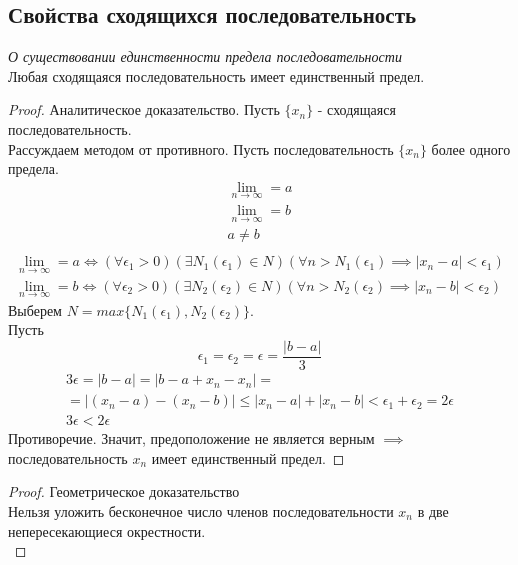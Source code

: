 \subsection{Свойства сходящихся последовательность}

\begin{theorem}
  \textit{О существовании единственности предела последовательности} \\
  Любая сходящаяся последовательность имеет единственный предел.
\end{theorem}
\begin{proof} Аналитическое доказательство.
  Пусть $\{x_{n}\} $ - сходящаяся последовательность. \\
  Рассуждаем методом от противного. Пусть последовательность $\{x_{n}\} $ более одного предела.
  \begin{gather*}
    \lim_{n \to \infty} = a \\
    \lim_{n \to \infty} = b \\
    a \neq b \\
  \end{gather*}
  \begin{gather}
    \lim_{n \to \infty} = a \iff (\forall \epsilon_1 > 0)(\exists N_1(\epsilon_1) \in N)(\forall n > N_1(\epsilon_1) \implies |x_{n} - a| < \epsilon_1) \\
    \lim_{n \to \infty} = b \iff (\forall \epsilon_2 > 0)(\exists N_2(\epsilon_2) \in N)(\forall n > N_2(\epsilon_2) \implies |x_{n} - b| < \epsilon_2)  
  \end{gather} 
  Выберем $N=max \{N_1\left( \epsilon_1 \right) , N_2\left( \epsilon_2 \right) \}$. \\
  Пусть 
  \[
    \epsilon_1 = \epsilon_2 = \epsilon = \frac{|b - a|}{3}
  \]
  \begin{gather*}
  3 \epsilon = |b - a| = |b - a + x_{n} - x_{n}| = \\
  = |(x_{n} - a) - (x_{n} - b)| \le |x_{n} - a| + |x_{n} - b| < \epsilon_1 + \epsilon_2 = 2 \epsilon \\
  3 \epsilon < 2 \epsilon
  \end{gather*}
  Противоречие. Значит, предоположение не является верным $\implies$ последовательность $x_{n}$ имеет единственный предел.
\end{proof}

\begin{proof} Геометрическое доказательство\\
  Нельзя уложить бесконечное число членов последовательности $x_{n}$ в две непересекающиеся окрестности. \\
\end{proof}

